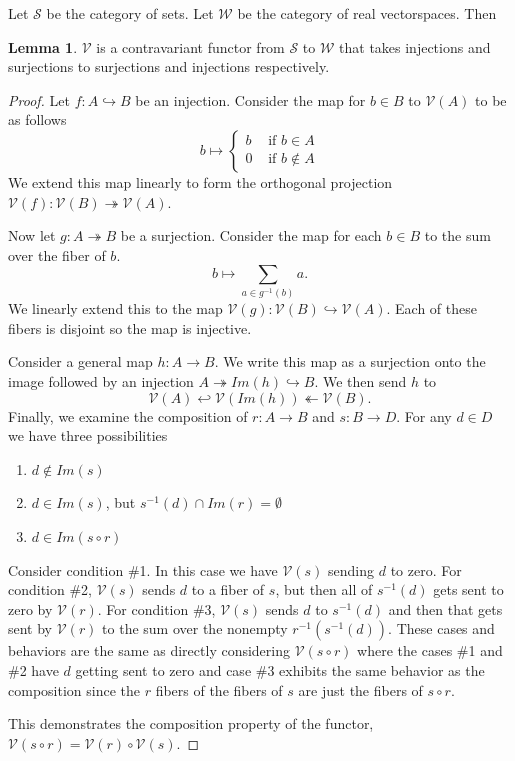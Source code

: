 \documentclass[12pt,a4paper]{article}
\theoremstyle{myrule}
\theoremstyle{postulate}
\theoremstyle{definition}
\newtheorem{lemma}[theorem]{Lemma}
\begin{document}
Let $\mathcal{S}$ be the category of sets.  Let $\mathcal{W}$ be the category of real vectorspaces.  Then
\begin{lemma}
$\mathcal{V}$ is a contravariant functor from $\mathcal{S}$ to $\mathcal{W}$ that takes injections and surjections to surjections and injections respectively.
\end{lemma}
\begin{proof}
  Let $f:A \hookrightarrow B$ be an injection. Consider the map for $b \in B$ to $\mathcal{V}(A)$ to be as follows
  \[
     b \mapsto \left\{ \begin{array}{cc} b & \text{ if } b \in A \\ 0 & \text{ if } b \not \in A  \end{array} \right.
     \]
We extend this map linearly to form the orthogonal projection $\mathcal{V}(f):\mathcal{V}(B) \twoheadrightarrow \mathcal{V}(A)$.

Now let $g:A \twoheadrightarrow B$ be a surjection.  Consider the map for each $b \in B$ to the sum over the fiber of $b$.
  \[
  b \mapsto \sum_{a \in g^{-1}(b)} a.
  \]
We linearly extend this to the map $\mathcal{V}(g):\mathcal{V}(B) \hookrightarrow  \mathcal{V}(A)$.  Each of these fibers is disjoint so the map is injective.

  Consider a general map $h:A \rightarrow B$.  We write this map as a surjection onto the image followed by an injection  $A \twoheadrightarrow Im(h) \hookrightarrow B$.  We then send $h$ to
 \[
 \mathcal{V}(A) \hookleftarrow \mathcal{V}(Im(h)) \twoheadleftarrow \mathcal{V}(B).
 \]
  Finally, we examine the composition of $r:A \rightarrow B$ and $s:B\rightarrow D$.  For any $d \in D$ we have three possibilities
  \begin{enumerate}
  \item $d \not \in Im(s)$
  \item $d \in Im(s)$, but $s^{-1}(d) \cap Im(r) = \emptyset$
  \item $d \in Im(s \circ r)$
  \end{enumerate}
  Consider condition \#1.  In this case we have $\mathcal{V}(s)$ sending $d$ to zero.  For condition \#2, $\mathcal{V}(s)$ sends $d$ to a fiber of $s$, but then all of $s^{-1}(d)$ gets sent to zero by $\mathcal{V}(r)$.  For condition \#3, $\mathcal{V}(s)$ sends $d$ to $s^{-1}(d)$ and then that gets sent by $\mathcal{V}(r)$ to the sum over the nonempty $r^{-1}(s^{-1}(d))$.  These cases and behaviors are the same as directly considering $\mathcal{V}(s \circ r)$ where the cases \#1 and \#2 have $d$ getting sent to zero and case \#3 exhibits the same behavior as the composition since the $r$ fibers of the fibers of $s$ are just the fibers of $s \circ r$.

  This demonstrates the composition property of the functor, $\mathcal{V}(s \circ r) = \mathcal{V}(r) \circ \mathcal{V}(s)$.
\end{proof}
\end{document}
